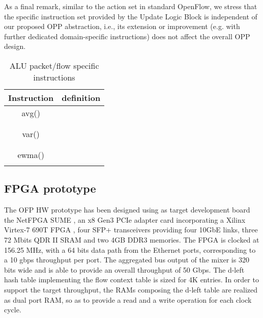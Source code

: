 \documentclass{sig-alternate}
\begin{document}
As a final remark, similar to the action set in standard OpenFlow, we stress that the specific instruction set provided by the Update Logic Block is independent of our proposed OPP abstraction, i.e., its extension or improvement (e.g. with further dedicated domain-specific instructions) does not affect the overall OPP design.

\begin{table}[t]
\vspace{-.6em}
\centering
\small
\begin{tabular}{|c|c|}
  \hline
 Instruction & definition \\
\hline
avg()  &  \\
       & \\
\hline
       & \\
var()  & \\
       & \\
\hline
        &  \\
ewma()  &  \\ 
		&  \\ 
\hline
\end{tabular}
      	  \vspace{-1em}
\caption{ALU packet/flow specific instructions}
      	  \vspace{-1em}
\label{T:specistr}
\end{table}

\subsection{FPGA prototype}
\label{s:proto}

The OFP HW prototype has been designed using as target development board the NetFPGA SUME \cite{sume}, an x8 Gen3 PCIe adapter card incorporating a Xilinx Virtex-7 690T FPGA \cite{V7},  four SFP+ transceivers providing four 10GbE links, three 72 Mbits QDR II SRAM and two 4GB DDR3 memories.
The FPGA is clocked at 156.25 MHz, with a 64 bits data path from the Ethernet ports, corresponding to a 10 gbps throughput per port. The aggregated bus output of the mixer is 320 bits wide and is able to provide an overall throughput of 50 Gbps. The d-left hash table implementing the flow context table is sized for 4K entries. In order to support the target throughput, the RAMs composing the d-left table are realized as dual port RAM, so as to provide a read and a write operation for each clock cycle.
\end{document}
